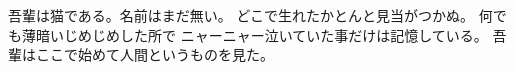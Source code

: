 \documentclass[dvipdfmx,uplatex]{jsarticle}
\begin{document}
   吾輩は猫である。名前はまだ無い。
どこで生れたかとんと見当がつかぬ。 何でも薄暗いじめじめした所で ニャーニャー泣いていた事だけは記憶している。 吾輩はここで始めて人間というものを見た。
     
\end{document}
